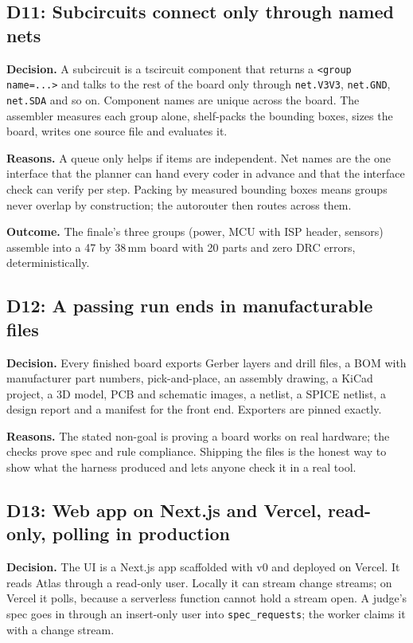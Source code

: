 \documentclass[11pt,a4paper]{article}
\newcommand{\code}[1]{\texttt{#1}}
\begin{document}
\subsection{D11: Subcircuits connect only through named nets}

\textbf{Decision.} A subcircuit is a tscircuit component that returns a \code{<group name=...>} and talks to the rest of the board only through \code{net.V3V3}, \code{net.GND}, \code{net.SDA} and so on. Component names are unique across the board. The assembler measures each group alone, shelf-packs the bounding boxes, sizes the board, writes one source file and evaluates it.

\textbf{Reasons.} A queue only helps if items are independent. Net names are the one interface that the planner can hand every coder in advance and that the interface check can verify per step. Packing by measured bounding boxes means groups never overlap by construction; the autorouter then routes across them.

\textbf{Outcome.} The finale's three groups (power, MCU with ISP header, sensors) assemble into a 47 by 38\,mm board with 20 parts and zero DRC errors, deterministically.

\subsection{D12: A passing run ends in manufacturable files}

\textbf{Decision.} Every finished board exports Gerber layers and drill files, a BOM with manufacturer part numbers, pick-and-place, an assembly drawing, a KiCad project, a 3D model, PCB and schematic images, a netlist, a SPICE netlist, a design report and a manifest for the front end. Exporters are pinned exactly.

\textbf{Reasons.} The stated non-goal is proving a board works on real hardware; the checks prove spec and rule compliance. Shipping the files is the honest way to show what the harness produced and lets anyone check it in a real tool.

\subsection{D13: Web app on Next.js and Vercel, read-only, polling in production}

\textbf{Decision.} The UI is a Next.js app scaffolded with v0 and deployed on Vercel. It reads Atlas through a read-only user. Locally it can stream change streams; on Vercel it polls, because a serverless function cannot hold a stream open. A judge's spec goes in through an insert-only user into \code{spec\_requests}; the worker claims it with a change stream.
\end{document}
